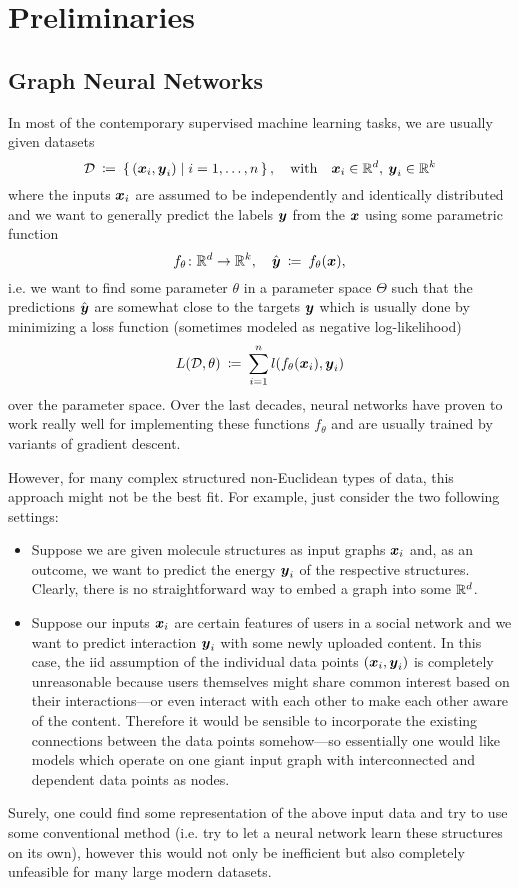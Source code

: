 \section{Preliminaries}

\subsection{Graph Neural Networks}

In most of the contemporary supervised machine learning tasks, we are usually given 
datasets
\[ 
    \mathcal{D} \: \coloneqq \: 
    \left\{\, (\boldsymbol{x}_i, \boldsymbol{y}_i) \; \middle| \; i=1, \dots, n \,\right\}, 
    \quad \text{with} \quad \boldsymbol{x}_i \in \mathbb{R}^{d}, \: \boldsymbol{y}_i \in \mathbb{R}^k 
\]
where the inputs $\boldsymbol{x}_i$ are assumed to be independently and identically 
distributed and we want to generally predict the labels $\boldsymbol{y}$ from the $\boldsymbol{x}$ using
some parametric function
\[
    f_\theta \colon \mathbb{R}^d \to \mathbb{R}^k, \quad
    \hat{\boldsymbol{y}} \: \coloneqq \: f_\theta(\boldsymbol{x}),
\]
i.e. we want to find some parameter $\theta$ in a parameter space $\Theta$ such that
the predictions $\hat{\boldsymbol{y}}$ are somewhat close to the targets $\boldsymbol{y}$ which is usually
done by minimizing a loss function (sometimes modeled as negative log-likelihood)
\[
    L(\mathcal{D}, \theta) \: \coloneqq \: \sum_{i=1}^n l(f_\theta(\boldsymbol{x}_i), \boldsymbol{y}_i)
\]
over the parameter space. Over the last decades, neural networks have proven to work 
really well for implementing these functions $f_\theta$ and are usually trained by 
variants of gradient descent.

However, for many complex structured non-Euclidean types of data, this approach might 
not be the best fit. For example, just consider the two following settings:
\begin{itemize}
    \item Suppose we are given molecule structures as input graphs $\boldsymbol{x}_i$ and, as an 
          outcome, we want to predict the energy $\boldsymbol{y}_i$ of the respective structures. 
          Clearly, there is no straightforward way to embed a graph into some $\mathbb{R}^d$.
    \item Suppose our inputs $\boldsymbol{x}_i$ are certain features of users in a social network
          and we want to predict interaction $\boldsymbol{y}_i$ with some newly uploaded content. In this 
          case, the iid assumption of the individual data points $(\boldsymbol{x}_i, \boldsymbol{y}_i)$ is 
          completely unreasonable because users themselves might share common interest 
          based on their interactions---or even interact with each other to make each 
          other aware of the content. Therefore it would be sensible to incorporate the 
          existing connections between the data points somehow---so essentially one would 
          like models which operate on one giant input graph with interconnected and 
          dependent data points as nodes.
\end{itemize}
Surely, one could find some representation of the above input data and try to use some
conventional method (i.e. try to let a neural network learn these structures on its own),
however this would not only be inefficient but also completely unfeasible for many large 
modern datasets. 

